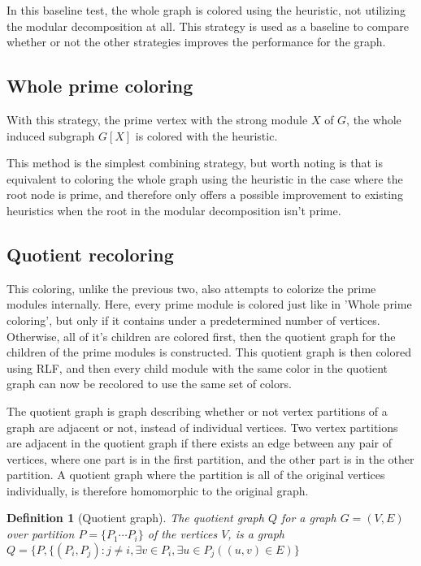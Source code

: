 \documentclass[a4paper]{article}
\newtheorem{definition}{Definition}[section]
\begin{document}
In this baseline test, the whole graph is colored using the heuristic, not
utilizing the modular decomposition at all. This strategy is used as a baseline
to compare whether or not the other strategies improves the performance for the
graph.

\subsection{Whole prime coloring}

With this strategy, the prime vertex with the strong module $X$ of $G$, the
whole induced subgraph $G[X]$ is colored with the heuristic.

This method is the simplest combining strategy, but worth noting is that is
equivalent to coloring the whole graph using the heuristic in the case where the
root node is prime, and therefore only offers a possible improvement to existing
heuristics when the root in the modular decomposition isn't prime.

\subsection{Quotient recoloring}

This coloring, unlike the previous two, also attempts to colorize the prime
modules internally. Here, every prime module is colored just like in 'Whole
prime coloring', but only if it contains under a predetermined number of
vertices. Otherwise, all of it's children are colored first, then the quotient
graph for the children of the prime modules is constructed. This quotient graph
is then colored using RLF, and then every child module with the same
color in the quotient graph can now be recolored to use the same set of colors.

The quotient graph is graph describing whether or not vertex partitions of a
graph are adjacent or not, instead of individual vertices. Two vertex
partitions are adjacent in the quotient graph if there exists an edge between
any pair of vertices, where one part is in the first partition, and the other
part is in the other partition. A quotient graph where the partition is all of
the original vertices individually, is therefore homomorphic to the original
graph.

\begin{definition}[Quotient graph]
    The quotient graph $Q$ for a graph $G = (V,E)$ over partition 
    $P = \{P_1 \cdots P_i\}$  of the vertices $V$, is a graph 
    $Q = \{P, \{(P_i,P_j) : j\neq i, \exists v \in P_i,\exists u \in P_j( (u,v)
    \in E)   \}   $
\end{definition}
\end{document}

